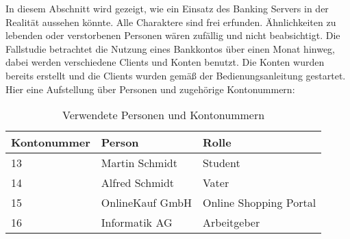 In diesem Abschnitt wird gezeigt, wie ein Einsatz des Banking Servers in der Realität aussehen könnte. Alle Charaktere sind frei erfunden. Ähnlichkeiten zu lebenden oder verstorbenen Personen wären zufällig und nicht beabsichtigt. Die Fallstudie betrachtet die Nutzung eines Bankkontos über einen Monat hinweg, dabei werden verschiedene Clients und Konten benutzt. Die Konten wurden bereits erstellt und die Clients wurden gemäß der Bedienungsanleitung gestartet. Hier eine Aufstellung über Personen und zugehörige Kontonummern:

\begin{table}[h]
\begin{tabular}{p{3 cm}| p{3 cm}| p{3 cm}}
Kontonummer & Person & Rolle\\
				\hline
				\hline
13 & Martin Schmidt & Student\\ \hline

14 & Alfred Schmidt & Vater\\ \hline

15 & OnlineKauf GmbH & Online Shopping Portal\\ \hline

16 & Informatik AG & Arbeitgeber\\ \hline
\end{tabular}\\
\caption{Verwendete Personen und Kontonummern}
\end{table}

